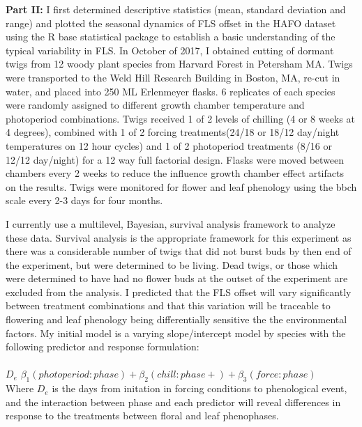 \documentclass{article}\usepackage[]{graphicx}\usepackage[]{color}
\begin{document}
\indent\textbf{Part II:} I first determined descriptive statistics (mean, standard deviation and range) and plotted the seasonal dynamics of FLS offset in the HAFO dataset using the R base statistical package to establish a basic understanding of the typical variability in FLS. In October of 2017, I obtained cutting of dormant twigs from 12 woody plant species from Harvard Forest in Petersham MA. Twigs were transported to the Weld Hill Research Building in Boston, MA, re-cut in water, and placed into 250 ML Erlenmeyer flasks. 6 replicates of each species were randomly assigned to different growth chamber temperature and photoperiod combinations. Twigs received 1 of 2 levels of chilling (4 or 8 weeks at 4 degrees), combined with 1 of 2 forcing treatments(24/18 or 18/12 day/night temperatures on 12 hour cycles) and 1 of 2 photoperiod treatments (8/16 or 12/12 day/night) for a 12 way full factorial design. Flasks were moved between chambers every 2 weeks to reduce the influence growth chamber effect artifacts on the results. Twigs were monitored for flower and leaf phenology using the bbch scale \citep{Finn2007} every 2-3 days for four months.
\par I currently  use a multilevel, Bayesian, survival analysis framework to analyze these data. Survival analysis is the appropriate framework for this experiment as there was a considerable number of twigs that did not burst buds by then end of the experiment, but were determined to be living. Dead twigs, or those which were determined to have had no flower buds at the outset of the experiment are excluded from the analysis. I predicted that the FLS offset will vary significantly between treatment combinations and that this variation will be traceable to flowering and leaf phenology being differentially sensitive the the environmental factors. My initial model is a varying slope/intercept model by species with the following predictor and response formulation:\\
\\
$D_e$ \Leftarrow $\beta_1(photoperiod:phase)+\beta_2(chill:phase+)+\beta_3 (force:phase) $\\

Where $D_e$ is the days from initation in forcing conditions to phenological event, and the interaction between phase and each predictor will reveal differences in response to the treatments between floral and leaf phenophases.\\
\end{document}
